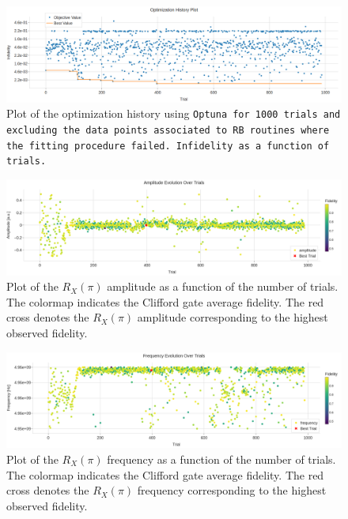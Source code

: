 \begin{figure}[h!]
    \centering
    \includegraphics[width=\textwidth]{figures/png/RB_optimization/Optuna/1000beta/optimization_true.png}
    \caption{Plot of the optimization history using \tt{Optuna} for 1000 trials and excluding the data points associated to RB routines where the fitting procedure failed. 
    Infidelity as a function of trials.}
    \label{fig:optuna1000beta:optimization_true}
\end{figure}

\begin{figure}[h!]
    \centering
    \includegraphics[width=\textwidth]{figures/png/RB_optimization/Optuna/1000beta/amplitude.png}
    \caption{Plot of the $R_X(\pi)$ amplitude as a function of the number of trials. 
    The colormap indicates the Clifford gate average fidelity. 
    The red cross denotes the $R_X(\pi)$ amplitude corresponding to the highest observed fidelity.}
    \label{fig:optuna1000beta:amplitude}
\end{figure}

\begin{figure}[h!]
    \centering
    \includegraphics[width=\textwidth]{figures/png/RB_optimization/Optuna/1000beta/frequency.png}
    \caption{Plot of the $R_X(\pi)$ frequency as a function of the number of trials. 
    The colormap indicates the Clifford gate average fidelity.  
    The red cross denotes the $R_X(\pi)$ frequency corresponding to the highest observed fidelity.}
    \label{fig:optuna1000beta:frequency}
\end{figure}

